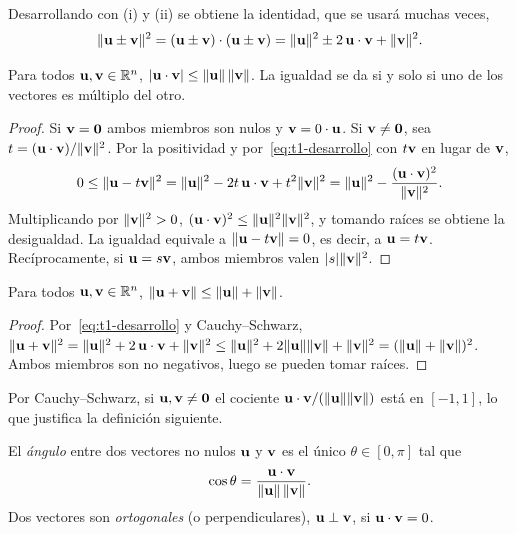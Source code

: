 Desarrollando con (i) y (ii) se obtiene la identidad, que se usará muchas veces,
\begin{equation}\label{eq:t1-desarrollo}
\lVert\mathbf{u}\pm\mathbf{v}\rVert^2=(\mathbf{u}\pm\mathbf{v})\cdot(\mathbf{u}\pm\mathbf{v})=\lVert\mathbf{u}\rVert^2\pm2\,\mathbf{u}\cdot\mathbf{v}+\lVert\mathbf{v}\rVert^2 .
\end{equation}

\begin{teorema}\label{teo:cs}
Para todos $\mathbf{u},\mathbf{v}\in\mathbb{R}^n$, $\lvert\mathbf{u}\cdot\mathbf{v}\rvert\le\lVert\mathbf{u}\rVert\,\lVert\mathbf{v}\rVert$. La igualdad se da si y solo si uno de los vectores es múltiplo del otro.
\end{teorema}

\begin{proof}
Si $\mathbf{v}=\mathbf{0}$ ambos miembros son nulos y $\mathbf{v}=0\cdot\mathbf{u}$. Si $\mathbf{v}\neq\mathbf{0}$, sea $t=(\mathbf{u}\cdot\mathbf{v})/\lVert\mathbf{v}\rVert^2$. Por la positividad y por~\eqref{eq:t1-desarrollo} con $t\mathbf{v}$ en lugar de $\mathbf{v}$,
\[
0\le\lVert\mathbf{u}-t\mathbf{v}\rVert^2=\lVert\mathbf{u}\rVert^2-2t\,\mathbf{u}\cdot\mathbf{v}+t^2\lVert\mathbf{v}\rVert^2=\lVert\mathbf{u}\rVert^2-\frac{(\mathbf{u}\cdot\mathbf{v})^2}{\lVert\mathbf{v}\rVert^2}.
\]
Multiplicando por $\lVert\mathbf{v}\rVert^2>0$, $(\mathbf{u}\cdot\mathbf{v})^2\le\lVert\mathbf{u}\rVert^2\lVert\mathbf{v}\rVert^2$, y tomando raíces se obtiene la desigualdad. La igualdad equivale a $\lVert\mathbf{u}-t\mathbf{v}\rVert=0$, es decir, a $\mathbf{u}=t\mathbf{v}$. Recíprocamente, si $\mathbf{u}=s\mathbf{v}$, ambos miembros valen $\lvert s\rvert\lVert\mathbf{v}\rVert^2$.
\end{proof}

\begin{corolario}\label{cor:triangular}
Para todos $\mathbf{u},\mathbf{v}\in\mathbb{R}^n$, $\lVert\mathbf{u}+\mathbf{v}\rVert\le\lVert\mathbf{u}\rVert+\lVert\mathbf{v}\rVert$.
\end{corolario}

\begin{proof}
Por~\eqref{eq:t1-desarrollo} y Cauchy--Schwarz, $\lVert\mathbf{u}+\mathbf{v}\rVert^2=\lVert\mathbf{u}\rVert^2+2\,\mathbf{u}\cdot\mathbf{v}+\lVert\mathbf{v}\rVert^2\le\lVert\mathbf{u}\rVert^2+2\lVert\mathbf{u}\rVert\lVert\mathbf{v}\rVert+\lVert\mathbf{v}\rVert^2=(\lVert\mathbf{u}\rVert+\lVert\mathbf{v}\rVert)^2$. Ambos miembros son no negativos, luego se pueden tomar raíces.
\end{proof}

Por Cauchy--Schwarz, si $\mathbf{u},\mathbf{v}\neq\mathbf{0}$ el cociente $\mathbf{u}\cdot\mathbf{v}/(\lVert\mathbf{u}\rVert\lVert\mathbf{v}\rVert)$ está en $[-1,1]$, lo que justifica la definición siguiente.

\begin{definicion}\label{def:angulo}
El \emph{ángulo} entre dos vectores no nulos $\mathbf{u}$ y $\mathbf{v}$ es el único $\theta\in[0,\pi]$ tal que
\[
\cos\theta=\frac{\mathbf{u}\cdot\mathbf{v}}{\lVert\mathbf{u}\rVert\,\lVert\mathbf{v}\rVert} .
\]
Dos vectores son \emph{ortogonales} (o perpendiculares), $\mathbf{u}\perp\mathbf{v}$, si $\mathbf{u}\cdot\mathbf{v}=0$.
\end{definicion}

